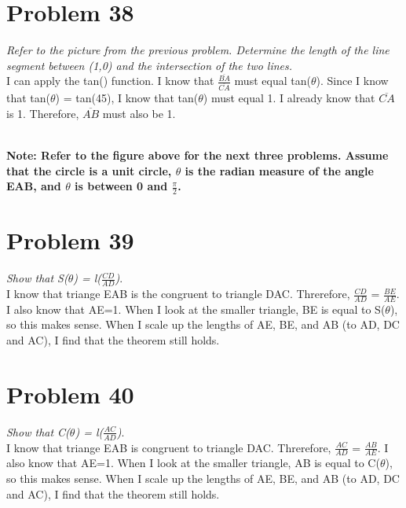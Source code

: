 \documentclass[11pt]{article} %
\newcommand\tab[1][1cm]{\hspace*{#1}}
\begin{document}
{\section{Problem 38}
\textit{Refer to the picture from the previous problem. Determine the length of the line segment between (1,0) and the intersection of the two lines.}
\\ \tab I can apply the tan() function. I know that $\frac{\overline{BA}}{\overline{CA}}$ must equal tan($\theta$). Since I know that tan($\theta$) = tan(45), I know that tan($\theta$) must equal 1. I already know that $\overline{CA}$ is 1. Therefore, $\overline{AB}$ must also be 1. 
\\
\\ \textbf{Note: Refer to the figure above for the next three problems. Assume that the circle is a unit circle, $\theta$ is the radian measure of the angle EAB, and $\theta$ is between 0 and $\frac{\pi}{2}$.}

\section{Problem 39}
\textit{Show that S($\theta$) = l($\frac{CD}{AD}$)}.
\\ \tab
I know that triange EAB is the congruent to triangle DAC. Threrefore, $\frac{CD}{AD}$ = $\frac{BE}{AE}$. I also know that AE=1. When I look at the smaller triangle, BE is equal to S($\theta$), so this makes sense. When I scale up the lengths of AE, BE, and AB (to AD, DC and AC), I find that the theorem still holds.

\section{Problem 40}
\textit{Show that C($\theta$) = l($\frac{AC}{AD}$)}.
\\ \tab
I know that triange EAB is congruent to triangle DAC. Threrefore, $\frac{AC}{AD}$ = $\frac{AB}{AE}$. I also know that AE=1. When I look at the smaller triangle, AB is equal to C($\theta$), so this makes sense. When I scale up the lengths of AE, BE, and AB (to AD, DC and AC), I find that the theorem still holds. 

}
\end{document}
